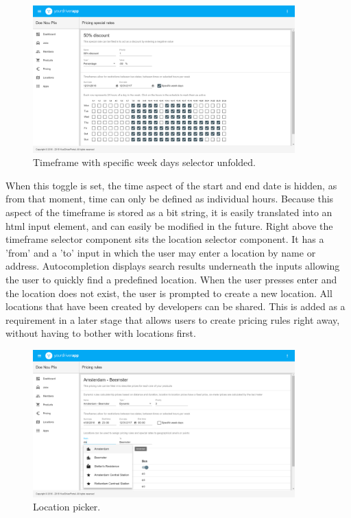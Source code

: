 \begin{figure}[H]
	\centering
	\includegraphics[width=0.9\textwidth]{Timeframes}
	\caption[Timeframe Component]{Timeframe with specific week days selector unfolded.}
	\label{fig:Timeframe Selector}
\end{figure}

When this toggle is set, the time aspect of the start and end date is hidden, as from that moment, time can only be defined as individual hours. Because this aspect of the timeframe is stored as a bit string, it is easily translated into an html input element, and can easily be modified in the future. Right above the timeframe selector component sits the location selector component. It has a 'from' and a 'to' input in which the user may enter a location by name or address. Autocompletion displays search results underneath the inputs allowing the user to quickly find a predefined location. When the user presses enter and the location does not exist, the user is prompted to create a new location. All locations that have been created by developers can be shared. This is added as a requirement in a later stage that allows users to create pricing rules right away, without having to bother with locations first.

\begin{figure}[H]
	\centering
	\includegraphics[width=0.9\textwidth]{Rules}
	\caption[Rules Component]{Location picker.}
	\label{fig:Location Selector}
\end{figure}

